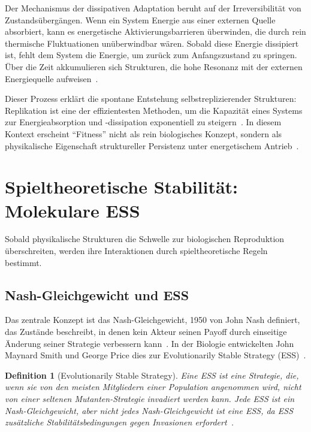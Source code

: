 \documentclass[12pt,a4paper]{article}
\newtheorem{definition}{Definition}
\theoremstyle{remark}
\begin{document}
Der Mechanismus der dissipativen Adaptation beruht auf der Irreversibilität von Zustandsübergängen. Wenn ein System Energie aus einer externen Quelle absorbiert, kann es energetische Aktivierungsbarrieren überwinden, die durch rein thermische Fluktuationen unüberwindbar wären. Sobald diese Energie dissipiert ist, fehlt dem System die Energie, um zurück zum Anfangszustand zu springen. Über die Zeit akkumulieren sich Strukturen, die hohe Resonanz mit der externen Energiequelle aufweisen~\citep{EnglandNano}.

Dieser Prozess erklärt die spontane Entstehung selbstreplizierender Strukturen: Replikation ist eine der effizientesten Methoden, um die Kapazität eines Systems zur Energieabsorption und -dissipation exponentiell zu steigern~\citep{EnglandNano}. In diesem Kontext erscheint ``Fitness'' nicht als rein biologisches Konzept, sondern als physikalische Eigenschaft struktureller Persistenz unter energetischem Antrieb~\citep{England2013}.

\section{Spieltheoretische Stabilität: Molekulare ESS}
\label{sec:molecular}

Sobald physikalische Strukturen die Schwelle zur biologischen Reproduktion überschreiten, werden ihre Interaktionen durch spieltheoretische Regeln bestimmt.

\subsection{Nash-Gleichgewicht und ESS}

Das zentrale Konzept ist das Nash-Gleichgewicht, 1950 von John Nash definiert, das Zustände beschreibt, in denen kein Akteur seinen Payoff durch einseitige Änderung seiner Strategie verbessern kann~\citep{NashPNAS,NashSFI}. In der Biologie entwickelten John Maynard Smith und George Price dies zur Evolutionarily Stable Strategy (ESS)~\citep{MaynardSmithPrice1973,MaynardSmith1982}.

\begin{definition}[Evolutionarily Stable Strategy]
Eine ESS ist eine Strategie, die, wenn sie von den meisten Mitgliedern einer Population angenommen wird, nicht von einer seltenen Mutanten-Strategie invadiert werden kann. Jede ESS ist ein Nash-Gleichgewicht, aber nicht jedes Nash-Gleichgewicht ist eine ESS, da ESS zusätzliche Stabilitätsbedingungen gegen Invasionen erfordert~\citep{MaynardSmith1982}.
\end{definition}
\end{document}
